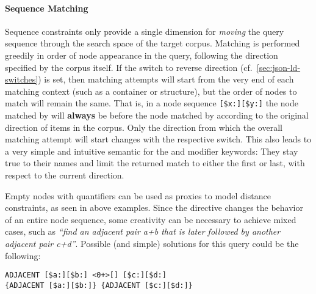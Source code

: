 \documentclass[11pt,a4paper]{article}
\begin{document}
\paragraph{Sequence Matching}
\noindent Sequence constraints only provide a single dimension for \textit{moving} the query sequence through the search space of the target corpus.
Matching is performed greedily in order of node appearance in the query, following the direction specified by the corpus itself.
If the switch to reverse direction (cf.~\ref{sec:json-ld-switches}) is set, then matching attempts will start from the very end of each matching context (such as a container or structure), but the order of nodes to match will remain the same.
That is, in a node sequence \verb|[$x:][$y:]| the node matched by  will \textbf{always} be before the node matched by  according to the original direction of items in the corpus.
Only the direction from which the overall matching attempt will start changes with the respective switch.
This also leads to a very simple and intuitive semantic for the  and  modifier keywords: They stay true to their names and limit the returned match to either the first or last, with respect to the current direction.


Empty nodes with quantifiers can be used as proxies to model distance constraints, as seen in above examples.
Since the  directive changes the behavior of an entire node sequence, some creativity can be necessary to achieve mixed cases, such as \textit{``find an adjacent pair a+b that is later followed by another adjacent pair c+d''}.
Possible (and simple) solutions for this query could be the following:
\begin{Verbatim}[samepage=true]
ADJACENT [$a:][$b:] <0+>[] [$c:][$d:]
{ADJACENT [$a:][$b:]} {ADJACENT [$c:][$d:]}
\end{Verbatim}
\end{document}

